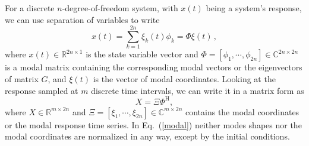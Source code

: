 \documentclass[10pt]{article}
\newcommand{\norm}[1]{\left\Vert#1\right\Vert}
\newcommand{\abs}[1]{\left\vert#1\right\vert}
\newcommand{\eq}[1]{Eq.\ (\ref{#1})}
\begin{document}
For a discrete $n$-degree-of-freedom system, with $x(t)$ being a system's response, we can use separation of variables to write
\begin{equation}
    x(t) = \sum_{k=1}^{2n} \xi_k(t) \phi_k = \Phi \xi(t)\,,
\end{equation}
where $x(t) \in \mathbb{R}^{2n\times 1}$ is the state variable vector and $\Phi = [\phi_1,\cdots,\phi_{2n}]\in\mathbb{C}^{2n\times 2n}$ is a modal matrix containing the corresponding modal vectors or the eigenvectors of matrix $G$, and $\xi(t)$ is the vector of modal coordinates.
Looking at the response sampled at $m$ discrete time intervals, we can write it in a matrix form as
\begin{equation}\label{modal}
    X = \Xi \Phi^\mathrm{H},
\end{equation}
where $X\in \mathbb{R}^{m\times 2n}$ and $\Xi=[\xi_1, \cdots, \xi_{2n}]\in\mathbb{C}^{m\times 2n}$ contains the modal coordinates or the modal response time series.
In \eq{modal} neither modes shapes nor the modal coordinates are normalized in any way, except by the initial conditions.
\end{document}
